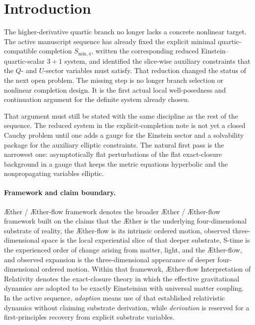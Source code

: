 \documentclass[11pt]{article}
\newcommand{\Aether}{\AE{}ther}
\newcommand{\Aflow}{\AE{}ther-flow}
\newcommand{\TheoryName}{\Aflow{} Interpretation of Relativity}
\newcommand{\TheoryProgram}{\Aether{} / \Aflow{} framework}
\begin{document}
\section{Introduction}

The higher-derivative quartic branch no longer lacks a concrete nonlinear target. The active manuscript sequence has already fixed the explicit minimal quartic-compatible completion \(S_{\mathrm{min},4}\), written the corresponding reduced Einstein--quartic-scalar \(3+1\) system, and identified the slice-wise auxiliary constraints that the \(Q\)- and \(U\)-sector variables must satisfy. That reduction changed the status of the next open problem. The missing step is no longer branch selection or nonlinear completion design. It is the first actual local well-posedness and continuation argument for the definite system already chosen.

That argument must still be stated with the same discipline as the rest of the sequence. The reduced system in the explicit-completion note is not yet a closed Cauchy problem until one adds a gauge for the Einstein sector and a solvability package for the auxiliary elliptic constraints. The natural first pass is the narrowest one: asymptotically flat perturbations of the flat exact-closure background in a gauge that keeps the metric equations hyperbolic and the nonpropagating variables elliptic.

\paragraph{Framework and claim boundary.}
\TheoryProgram{} denotes the broader \Aether{} / \Aflow{} framework built on the claims that the \Aether{} is the underlying four-dimensional substrate of reality, the \Aflow{} is its intrinsic ordered motion, observed three-dimensional space is the local experiential slice of that deeper substrate, S-time is the experienced order of change arising from matter, light, and the \Aflow{}, and observed expansion is the three-dimensional appearance of deeper four-dimensional ordered motion. Within that framework, \TheoryName{} denotes the exact-closure theory in which the effective gravitational dynamics are adopted to be exactly Einsteinian with universal matter coupling. In the active sequence, \emph{adoption} means use of that established relativistic dynamics without claiming substrate derivation, while \emph{derivation} is reserved for a first-principles recovery from explicit substrate variables.
\end{document}
